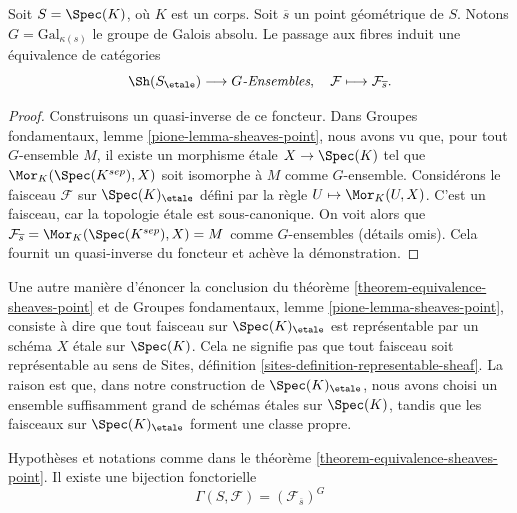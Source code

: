 \begin{theorem}
\label{theorem-equivalence-sheaves-point}
Soit $S = \Spec(K)$, o\`u $K$ est un corps.
Soit $\overline{s}$ un point g\'eom\'etrique de $S$.
Notons $G = \text{Gal}_{\kappa(s)}$ le groupe de Galois absolu.
Le passage aux fibres induit une \'equivalence de cat\'egories
$$
\Sh(S_\etale) \longrightarrow G\textit{-Ensembles},
\quad
\mathcal{F} \longmapsto \mathcal{F}_{\overline{s}}.
$$
\end{theorem}

\begin{proof}
Construisons un quasi-inverse de ce foncteur. Dans
Groupes fondamentaux, lemme \ref{pione-lemma-sheaves-point},
nous avons vu que, pour tout $G$-ensemble $M$, il existe un morphisme \'etale
$X \to \Spec(K)$
tel que $\Mor_K(\Spec(K^{sep}), X)$ soit
isomorphe \`a $M$ comme $G$-ensemble. Consid\'erons le faisceau
$\mathcal{F}$ sur $\Spec(K)_\etale$ d\'efini par
la r\`egle $U \mapsto \Mor_K(U, X)$. C'est un faisceau, car la topologie
\'etale est sous-canonique. On voit alors que
$\mathcal{F}_{\overline{s}} = \Mor_K(\Spec(K^{sep}), X) = M$
comme $G$-ensembles (d\'etails omis). Cela fournit un quasi-inverse du foncteur et
ach\`eve la d\'emonstration.
\end{proof}

\begin{remark}
\label{remark-every-sheaf-representable}
Une autre mani\`ere d'\'enoncer la conclusion du
th\'eor\`eme \ref{theorem-equivalence-sheaves-point} et de
Groupes fondamentaux, lemme \ref{pione-lemma-sheaves-point},
consiste \`a dire que tout faisceau sur $\Spec(K)_\etale$ est repr\'esentable
par un sch\'ema $X$ \'etale sur $\Spec(K)$.
Cela ne signifie pas que tout faisceau soit repr\'esentable au sens de
Sites, d\'efinition \ref{sites-definition-representable-sheaf}.
La raison est que, dans notre construction de $\Spec(K)_\etale$,
nous avons choisi un ensemble suffisamment grand de sch\'emas \'etales sur $\Spec(K)$,
tandis que les faisceaux sur $\Spec(K)_\etale$ forment une classe propre.
\end{remark}

\begin{lemma}
\label{lemma-global-sections-point}
Hypoth\`eses et notations comme dans le
th\'eor\`eme \ref{theorem-equivalence-sheaves-point}.
Il existe une bijection fonctorielle
$$
\Gamma(S, \mathcal{F}) = (\mathcal{F}_{\overline{s}})^G
$$
\end{lemma}

